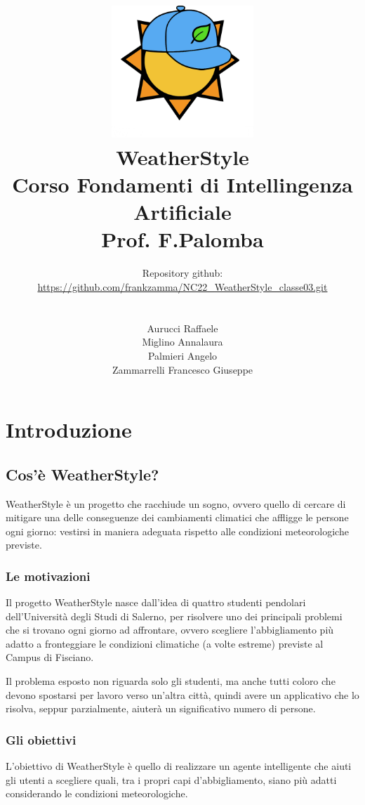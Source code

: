 \documentclass[a4paper, 11pt, oneside]{report}
\title{\includegraphics[width=0.4\textwidth]{logo}\\WeatherStyle\\Corso Fondamenti di Intellingenza Artificiale\\Prof. F.Palomba}
\author{Repository github:\\\url{https://github.com/frankzamma/NC22_WeatherStyle_classe03.git}\\\\
        \\Aurucci Raffaele\\Miglino Annalaura\\Palmieri Angelo\\Zammarrelli Francesco Giuseppe}
\date{}
\begin{document}
    \begin{titlepage}
        \maketitle
    \end{titlepage}
    \tableofcontents

    \part{Introduzione}
        \chapter{Cos'è WeatherStyle?}
            WeatherStyle è un progetto che racchiude un sogno, ovvero quello di cercare di mitigare una delle conseguenze
            dei cambiamenti climatici che affligge le persone ogni giorno: vestirsi in maniera adeguata rispetto alle condizioni
            meteorologiche previste.

            \section{Le motivazioni}
            Il progetto WeatherStyle nasce dall'idea di quattro studenti pendolari dell'Università degli Studi di Salerno, per
            risolvere uno dei principali problemi che si trovano ogni giorno ad affrontare, ovvero scegliere l'abbigliamento
            più adatto a fronteggiare le condizioni climatiche (a volte estreme) previste al Campus di Fisciano.
            \par \noindent Il problema esposto non riguarda solo gli studenti, ma anche tutti coloro che devono spostarsi per lavoro
            verso un'altra città, quindi avere un applicativo che lo risolva, seppur parzialmente,
            aiuterà un significativo numero di persone.

            \section{Gli obiettivi}
            L'obiettivo di WeatherStyle è quello di realizzare un agente intelligente che aiuti gli utenti a scegliere quali,
            tra i propri capi d'abbigliamento, siano più adatti considerando le condizioni meteorologiche.

            \bigskip \bigskip \bigskip
\end{document}
